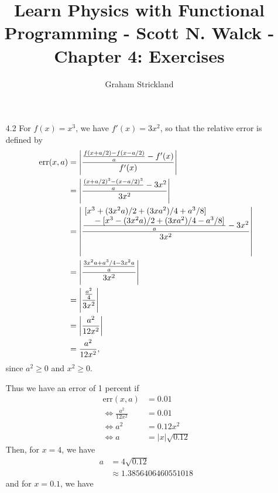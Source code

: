 \documentclass{article}
\title{Learn Physics with Functional Programming - Scott N. Walck - Chapter 4: Exercises}
\author{Graham Strickland}
\begin{document}
\maketitle  

\begin{itemize}
    \item[4.2]
    For $f(x) = x^3$, we have $f'(x) = 3x^2$, so that the relative error is defined by
    \begin{equation*}
        \begin{split}
            \text{err}(x, a) &= \left| \frac{\frac{f(x + a/2) - f(x - a/2)}{a} - f'(x)}{f'(x)} \right| \\
            &= \left| \frac{\frac{(x + a/2)^3 - (x - a/2)^3}{a} - 3x^2}{3x^2} \right| \\
            &= \left| \frac{\frac{\splitfrac{[x^3 + (3x^2a)/2 + (3xa^2)/4 + a^3/8]}
                {{} - [x^3 - (3x^2a)/2 + (3xa^2)/4 - a^3/8]}}{a} - 3x^2}{3x^2} \right| \\
            &= \left| \frac{\frac{3x^2a + a^3/4 - 3x^2a}{a}}{3x^2} \right| \\
            &= \left| \frac{\frac{a^2}{4}}{3x^2} \right| \\
            &= \left| \frac{a^2}{12x^2} \right| \\
            &= \frac{a^2}{12x^2},
        \end{split}
    \end{equation*}
    since $a^2 \geq 0$ and $x^2 \geq 0$.\par
    \qquad Thus we have an error of 1 percent if 
    \begin{equation*}
        \begin{split}
            \text{err}(x, a) &= 0.01 \\
            \Leftrightarrow \frac{a^2}{12x^2} &= 0.01 \\
            \Leftrightarrow a^2 &= 0.12x^2 \\
            \Leftrightarrow a &= |x|\sqrt{0.12}
        \end{split}
    \end{equation*}
    \qquad Then, for $x = 4$, we have
    \begin{equation*}
        \begin{split}
            a &= 4\sqrt{0.12} \\
            &\approx 1.3856406460551018
        \end{split}
    \end{equation*}
    and for $x = 0.1$, we have

\end{itemize}
\end{document}
